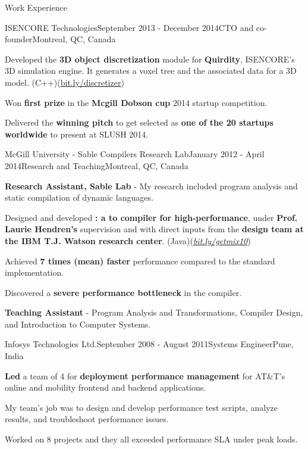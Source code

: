\documentclass{resume} %
\begin{document}
\begin{rSection}{Work Experience}
\begin{rSubsection}{ISENCORE Technologies}{September 2013 - December 2014}{CTO
        and co-founder}{Montreal, QC, Canada}
\item Developed the \textbf{3D object discretization} module for
        \textbf{Quirdity}, ISENCORE's 3D simulation engine. It generates a
        voxel tree and the associated data for a 3D model.
        (C++)(\href{http://bit.ly/discretizer}{bit.ly/discretizer})
\item Won \textbf{first prize} in the \textbf{Mcgill Dobson cup} 2014 startup
        competition. 
\item Delivered the \textbf{winning pitch} to get selected as \textbf{one of
        the 20 startups worldwide} to present at SLUSH 2014.
\end{rSubsection}

\begin{rSubsection}{McGill University - Sable Compilers Research Lab}{January
        2012 - April 2014}{Research and Teaching}{Montreal, QC, Canada} 
\item \textbf{Research Assistant, Sable Lab} - My research included program
        analysis and static compilation of dynamic languages.

\begin{lsubSubsection}
\item Designed and developed \textbf{\mixtenx: a \matlab to \xten  compiler for
        high-performance}, under \textbf{Prof. Laurie Hendren's} supervision
        and with direct inputs from the \textbf{\xten design team at the IBM
        T.J. Watson research center}.
        (Java)(\href{http://bit.ly/getmix10}{\em{bit.ly/getmix10}})  
 \item Achieved \textbf{7 times (mean) faster} performance compared to the
 standard \matlab implementation.
  \item Discovered a \textbf{severe performance bottleneck}
in the \xten compiler.  
\end{lsubSubsection}
\item \textbf{Teaching Assistant} - Program Analysis and Transformations,
	Compiler Design, and Introduction to Computer Systems.
\end{rSubsection}

\begin{rSubsection}{Infosys Technologies Ltd.}{September 2008 - August
        2011}{Systems Engineer}{Pune, India}
\item \textbf{Led} a team of 4 for \textbf{deployment performance management}
	for AT\&T's online and mobility frontend and backend applications.
\begin{lsubSubsection}
\item My team's job was to design and develop performance test scripts, analyze
	results, and troubleshoot performance issues.  
\item {Worked on 8 projects} and they all exceeded performance SLA under peak
	loads.
\end{lsubSubsection}
\end{rSubsection}


\end{rSection}
\end{document}
